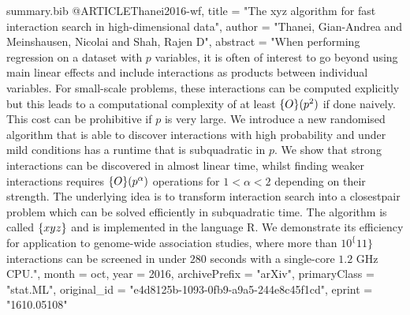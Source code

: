 \begin{filecontents*}{summary.bib}
@ARTICLE{Thanei2016-wf,
	title         = "The xyz algorithm for fast interaction search in
	high-dimensional data",
	author        = "Thanei, Gian-Andrea and Meinshausen, Nicolai and Shah, Rajen
	D",
	abstract      = "When performing regression on a dataset with $p$ variables,
	it is often of interest to go beyond using main linear
	effects and include interactions as products between
	individual variables. For small-scale problems, these
	interactions can be computed explicitly but this leads to a
	computational complexity of at least $\mathcal\{O\}(p^2)$ if
	done naively. This cost can be prohibitive if $p$ is very
	large. We introduce a new randomised algorithm that is able
	to discover interactions with high probability and under
	mild conditions has a runtime that is subquadratic in $p$.
	We show that strong interactions can be discovered in almost
	linear time, whilst finding weaker interactions requires
	$\mathcal\{O\}(p^\alpha)$ operations for $1 < \alpha < 2$
	depending on their strength. The underlying idea is to
	transform interaction search into a closestpair problem
	which can be solved efficiently in subquadratic time. The
	algorithm is called $\mathit\{xyz\}$ and is implemented in
	the language R. We demonstrate its efficiency for
	application to genome-wide association studies, where more
	than $10^\{11\}$ interactions can be screened in under $280$
	seconds with a single-core $1.2$ GHz CPU.",
	month         =  oct,
	year          =  2016,
	archivePrefix = "arXiv",
	primaryClass  = "stat.ML",
	original_id   = "e4d8125b-1093-0fb9-a9a5-244e8c45f1cd",
	eprint        = "1610.05108"
}
\end{filecontents*}

\documentclass{amsart}

\usepackage{todonotes}


	
\section{Data Generation}
We simulated siRNA–gene perturbation matrices based on four
commercially available genome–wide libraries for 20,822 human genes from Qiagen with an overall size of 90,000 siRNAs. First, we predicted sequence dependent off-targets using TargetScan [23] for each siRNA as described in [13]. We thresholded all predictions to be 1 if
larger than zero and 0 otherwise
to produce the matrix $Q$.


